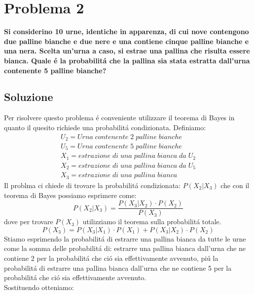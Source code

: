 \documentclass[paper=a4, fontsize=11pt]{scrartcl} %
\numberwithin{equation}{section} %
\numberwithin{figure}{section} %
\numberwithin{table}{section} %
\begin{document}
\section*{Problema 2}

\textbf{Si considerino 10 urne, identiche in apparenza, di cui nove contengono due palline bianche e due nere e una contiene cinque palline bianche e una nera. Scelta un'urna a caso, si estrae una pallina che risulta essere bianca. Quale \'e la probabilit\'a che la pallina sia stata estratta dall'urna contenente 5 palline bianche?}

\subsection*{Soluzione}
Per risolvere questo problema \'e conveniente utilizzare il teorema di Bayes in quanto il quesito richiede una probabilit\'a condizionata.
Definiamo:
\begin{align}
U_2 = Urna\; contenente\; 2\; palline\; bianche\\
U_5 = Urna\; contenente\; 5\; palline\; bianche\\
X_1 = estrazione\; di\; una\; pallina\; bianca\; da\; U_2\\
X_2 = estrazione\; di\; una\; pallina\; bianca\; da\; U_5\\
X_3 = estrazione\; di\; una\; pallina\; bianca
\end{align}
Il problma ci chiede di trovare la probabilit\'a condizionata: $P(X_2 | X_3)$ che con il teorema di Bayes possiamo esprimere come:
$$
P(X_2 | X_3) = \frac{P(X_3 | X_2) \cdot P(X_2)}{P(X_3)}
$$
dove per trovare $P(X_3)$ utilizziamo il teorema sulla probabilit\'a totale.
$$
P(X_3) = P(X_3 | X_1) \cdot P(X_1) + P(X_3 | X_2) \cdot P(X_2) 
$$
Stiamo esprimendo la probabilit\'a di estrarre una pallina bianca da tutte le urne come la somma delle probabilit\'a di: estrarre una pallina bianca dall'urna che ne contiene 2 per la probabilit\'a che ci\'o sia effettivamente avvenuto, pi\'u la probabilit\'a di estrarre una pallina bianca dall'urna che ne contiene 5 per la probabilit\'a che ci\'o sia effettivamente avvenuto.\\
Sostituendo otteniamo:
$$
$$
\end{document}
